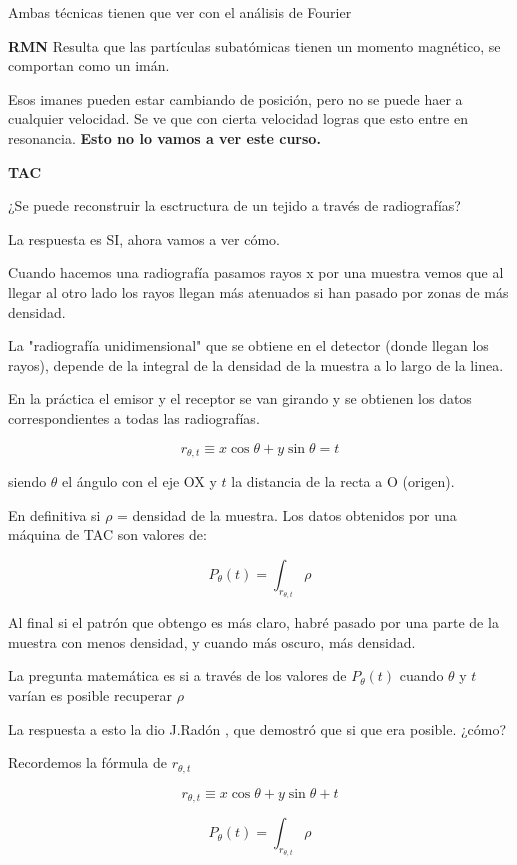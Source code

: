	Ambas técnicas tienen que ver con el análisis de Fourier
	
	\textbf{RMN} Resulta que las partículas subatómicas tienen un momento magnético, se comportan como un imán.
	
	Esos imanes pueden estar cambiando de posición, pero no se puede haer a cualquier velocidad.
	Se ve que con cierta velocidad logras que esto entre en resonancia. \textbf{Esto no lo vamos a ver este curso.}
	
	\textbf{TAC} 
	
	¿Se puede reconstruir la esctructura de un tejido a través de radiografías?
	
	La respuesta es SI, ahora vamos a ver cómo.

	
	Cuando hacemos una radiografía pasamos rayos x por una muestra vemos que al llegar al otro lado los rayos llegan más atenuados si han pasado por zonas de más densidad.
	
	La "radiografía unidimensional" que se obtiene en el detector (donde llegan los rayos), depende de la integral de la densidad de la muestra a lo largo de la linea.
	
	En la práctica el emisor y el receptor se van girando y se obtienen los datos correspondientes a todas las radiografías.
	
	$$r_{\theta , t} \equiv x \cos\theta + y\sin\theta = t$$
	
	
	siendo $\theta$ el ángulo con el eje OX y $t$
 la distancia de la recta a O (origen).


En definitiva si $\rho$ = densidad de la muestra. Los datos obtenidos por una máquina de TAC son valores de:

$$P_{\theta} (t) = \int_{r_{\theta , t}} \rho$$

Al final si el patrón que obtengo es más claro, habré pasado por una parte de la muestra con menos densidad, y cuando más oscuro, más densidad.

La pregunta matemática es si a través de los valores de $P_{\theta}(t)$ cuando $\theta$ y $t$ varían es posible recuperar $\rho$

La respuesta a esto la dio J.Radón , que demostró que si que era posible. ¿cómo?

Recordemos la fórmula de $r_{\theta,t}$

	$$r_{\theta , t} \equiv x \cos\theta + y\sin\theta + t$$
	
	$$P_{\theta} (t) = \int_{r_{\theta , t}} \rho $$
	
